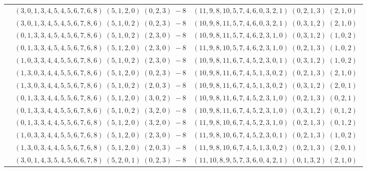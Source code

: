 \documentclass[11pt]{article}
\begin{document}
\begin{longtable}[l]{|c|c|c|}
 \cline{2-3} 
 & $(3 ,0 ,1 ,3 ,4 ,5 ,4 ,5 ,6 ,7 ,6 ,8) \;(5 ,1 ,2 ,0) \;(0 ,2 ,3) \;-8$ & $(11 ,9 ,8 ,10 ,5 ,7 ,4 ,6 ,0 ,3 ,2 ,1) \;(0 ,2 ,1 ,3) \;(2 ,1 ,0) \;$\\ 
 \cline{2-3} 
 & $(3 ,0 ,1 ,3 ,4 ,5 ,4 ,5 ,6 ,7 ,8 ,6) \;(5 ,1 ,0 ,2) \;(0 ,2 ,3) \;-8$ & $(10 ,9 ,8 ,11 ,5 ,7 ,4 ,6 ,0 ,3 ,2 ,1) \;(0 ,3 ,1 ,2) \;(2 ,1 ,0) \;$\\ 
 \cline{2-3} 
 & $(0 ,1 ,3 ,3 ,4 ,5 ,4 ,5 ,6 ,7 ,8 ,6) \;(5 ,1 ,0 ,2) \;(2 ,3 ,0) \;-8$ & $(10 ,9 ,8 ,11 ,5 ,7 ,4 ,6 ,2 ,3 ,1 ,0) \;(0 ,3 ,1 ,2) \;(1 ,0 ,2) \;$\\ 
 \cline{2-3} 
 & $(0 ,1 ,3 ,3 ,4 ,5 ,4 ,5 ,6 ,7 ,6 ,8) \;(5 ,1 ,2 ,0) \;(2 ,3 ,0) \;-8$ & $(11 ,9 ,8 ,10 ,5 ,7 ,4 ,6 ,2 ,3 ,1 ,0) \;(0 ,2 ,1 ,3) \;(1 ,0 ,2) \;$\\ 
 \cline{2-3} 
 & $(1 ,0 ,3 ,3 ,4 ,4 ,5 ,5 ,6 ,7 ,8 ,6) \;(5 ,1 ,0 ,2) \;(2 ,3 ,0) \;-8$ & $(10 ,9 ,8 ,11 ,6 ,7 ,4 ,5 ,2 ,3 ,0 ,1) \;(0 ,3 ,1 ,2) \;(1 ,0 ,2) \;$\\ 
 \cline{2-3} 
 & $(1 ,3 ,0 ,3 ,4 ,4 ,5 ,5 ,6 ,7 ,8 ,6) \;(5 ,1 ,2 ,0) \;(0 ,2 ,3) \;-8$ & $(10 ,9 ,8 ,11 ,6 ,7 ,4 ,5 ,1 ,3 ,0 ,2) \;(0 ,2 ,1 ,3) \;(2 ,1 ,0) \;$\\ 
 \cline{2-3} 
 & $(1 ,3 ,0 ,3 ,4 ,4 ,5 ,5 ,6 ,7 ,8 ,6) \;(5 ,1 ,0 ,2) \;(2 ,0 ,3) \;-8$ & $(10 ,9 ,8 ,11 ,6 ,7 ,4 ,5 ,1 ,3 ,0 ,2) \;(0 ,3 ,1 ,2) \;(2 ,0 ,1) \;$\\ 
 \cline{2-3} 
 & $(0 ,1 ,3 ,3 ,4 ,4 ,5 ,5 ,6 ,7 ,8 ,6) \;(5 ,1 ,2 ,0) \;(3 ,0 ,2) \;-8$ & $(10 ,9 ,8 ,11 ,6 ,7 ,4 ,5 ,2 ,3 ,1 ,0) \;(0 ,2 ,1 ,3) \;(0 ,2 ,1) \;$\\ 
 \cline{2-3} 
 & $(0 ,1 ,3 ,3 ,4 ,4 ,5 ,5 ,6 ,7 ,8 ,6) \;(5 ,1 ,0 ,2) \;(3 ,2 ,0) \;-8$ & $(10 ,9 ,8 ,11 ,6 ,7 ,4 ,5 ,2 ,3 ,1 ,0) \;(0 ,3 ,1 ,2) \;(0 ,1 ,2) \;$\\ 
 \cline{2-3} 
 & $(0 ,1 ,3 ,3 ,4 ,4 ,5 ,5 ,6 ,7 ,6 ,8) \;(5 ,1 ,2 ,0) \;(3 ,2 ,0) \;-8$ & $(11 ,9 ,8 ,10 ,6 ,7 ,4 ,5 ,2 ,3 ,1 ,0) \;(0 ,2 ,1 ,3) \;(0 ,1 ,2) \;$\\ 
 \cline{2-3} 
 & $(1 ,0 ,3 ,3 ,4 ,4 ,5 ,5 ,6 ,7 ,6 ,8) \;(5 ,1 ,2 ,0) \;(2 ,3 ,0) \;-8$ & $(11 ,9 ,8 ,10 ,6 ,7 ,4 ,5 ,2 ,3 ,0 ,1) \;(0 ,2 ,1 ,3) \;(1 ,0 ,2) \;$\\ 
 \cline{2-3} 
 & $(1 ,3 ,0 ,3 ,4 ,4 ,5 ,5 ,6 ,7 ,6 ,8) \;(5 ,1 ,2 ,0) \;(2 ,0 ,3) \;-8$ & $(11 ,9 ,8 ,10 ,6 ,7 ,4 ,5 ,1 ,3 ,0 ,2) \;(0 ,2 ,1 ,3) \;(2 ,0 ,1) \;$\\ 
 \cline{2-3} 
 & $(3 ,0 ,1 ,4 ,3 ,5 ,4 ,5 ,6 ,6 ,7 ,8) \;(5 ,2 ,0 ,1) \;(0 ,2 ,3) \;-8$ & $(11 ,10 ,8 ,9 ,5 ,7 ,3 ,6 ,0 ,4 ,2 ,1) \;(0 ,1 ,3 ,2) \;(2 ,1 ,0) \;$\\ 

\end{longtable}
\end{document}
